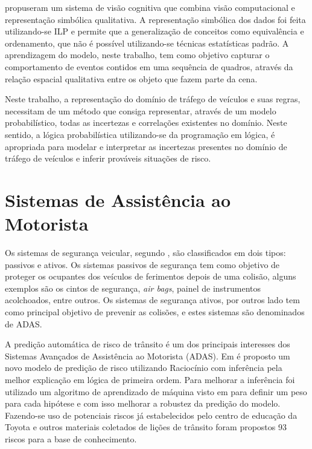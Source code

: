 \documentclass[
	12pt,				%
    oneside,			%
	a4paper,			%
	english,			%
	french,				%
	spanish,			%
	brazil,				%
	]{abntex2}
\begin{document}
 propuseram um sistema de visão cognitiva que combina visão computacional e representação simbólica qualitativa. A representação simbólica dos dados foi feita utilizando-se ILP e permite que a generalização de conceitos como equivalência e ordenamento, que não é possível utilizando-se técnicas estatísticas padrão.  A aprendizagem do modelo, neste trabalho, tem como objetivo capturar o comportamento de eventos contidos em uma sequência de quadros, através da relação espacial qualitativa entre os objeto que fazem parte da cena.

Neste trabalho, a representação do domínio de tráfego de veículos e suas regras, necessitam de um método que consiga representar, através de um modelo probabilístico, todas as incertezas e correlações existentes no domínio. Neste sentido, a lógica probabilística utilizando-se da programação em lógica, é apropriada para modelar e interpretar as incertezas presentes no domínio de tráfego de veículos e inferir prováveis situações de risco.

\section {Sistemas de Assistência ao Motorista}

Os sistemas de segurança veicular, segundo , são classificados em dois tipos: passivos e ativos. Os sistemas passivos de segurança tem como objetivo de proteger os ocupantes dos veículos de ferimentos depois de uma colisão, alguns exemplos são os cintos de segurança, \textit{air bags}, painel de instrumentos acolchoados, entre outros. Os sistemas de segurança ativos, por outros lado tem como principal objetivo de prevenir as colisões, e estes sistemas são denominados de ADAS.

A predição automática de risco de trânsito é um dos principais interesses dos Sistemas Avançados de Assistência ao Motorista (ADAS). Em  é proposto um novo modelo de predição de risco utilizando Raciocínio com inferência pela melhor explicação em lógica de primeira ordem. Para melhorar a inferência foi utilizado um algoritmo de aprendizado de máquina visto em  para definir um peso para cada hipótese e com isso melhorar a robustez da predição do modelo. Fazendo-se uso de potenciais riscos já estabelecidos pelo centro de educação da Toyota e outros materiais coletados de lições de trânsito foram propostos 93 riscos para a base de conhecimento.
\end{document}
